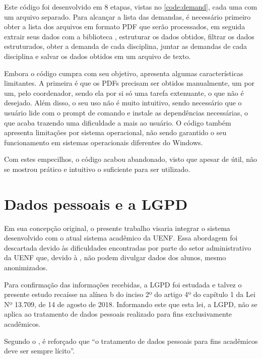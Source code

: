 

Este código foi desenvolvido em 8 etapas, vistas no \autoref{code:demand}, cada uma com um arquivo separado. Para alcançar a lista das demandas, é necessário primeiro obter a lista dos arquivos em formato PDF que serão processados, em seguida extrair seus dados com a biblioteca , estruturar os dados obtidos, filtrar os dados estruturados, obter a demanda de cada disciplina, juntar as demandas de cada disciplina e salvar os dados obtidos em um arquivo de texto.

Embora o código cumpra com seu objetivo, apresenta algumas características limitantes. A primeira é que os PDFs precisam ser obtidos manualmente, um por um, pelo coordenador, sendo ela por si só uma tarefa extenuante, o que não é desejado. Além disso, o seu uso não é muito intuitivo, sendo necessário que o usuário lide com o prompt de comando e instale as dependências necessárias, o que acaba trazendo uma dificuldade a mais ao usuário. O código também apresenta limitações por sistema operacional, não sendo garantido o seu funcionamento em sistemas operacionais diferentes do Windows.

Com estes empecilhos, o código acabou abandonado, visto que apesar de útil, não se mostrou prático e intuitivo o suficiente para ser utilizado.

\section{Dados pessoais e a LGPD} \label{sec:LGPD} %

Em sua concepção original, o presente trabalho visaria integrar o sistema desenvolvido com o atual sistema acadêmico da UENF. Essa abordagem foi descartada devido às dificuldades encontradas por parte do setor administrativo da UENF que, devido à , não podem divulgar dados dos alunos, mesmo anonimizados.

Para confirmação das informações recebidas, a LGPD foi estudada e talvez o presente estudo recaísse na alínea b do inciso 2º do artigo 4º do capítulo 1 da Lei Nº 13.709, de 14 de agosto de 2018. Informando este que esta lei, a LGPD, não se aplica ao tratamento de dados pessoais realizado para fins exclusivamente acadêmicos.

Segundo o , é reforçado que ``o tratamento de dados pessoais para fins acadêmicos deve ser sempre lícito''.

